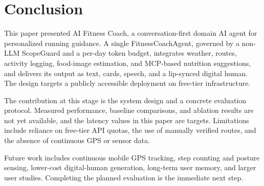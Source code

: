 \section{Conclusion}\label{sec:conclusion}
This paper presented AI Fitness Coach, a conversation-first domain AI agent for personalized running guidance. A single FitnessCoachAgent, governed by a non-LLM ScopeGuard and a per-day token budget, integrates weather, routes, activity logging, food-image estimation, and MCP-based nutrition suggestions, and delivers its output as text, cards, speech, and a lip-synced digital human. The design targets a publicly accessible deployment on free-tier infrastructure.

The contribution at this stage is the system design and a concrete evaluation protocol. Measured performance, baseline comparisons, and ablation results are not yet available, and the latency values in this paper are targets. Limitations include reliance on free-tier API quotas, the use of manually verified routes, and the absence of continuous GPS or sensor data.

Future work includes continuous mobile GPS tracking, step counting and posture sensing, lower-cost digital-human generation, long-term user memory, and larger user studies. Completing the planned evaluation is the immediate next step.
